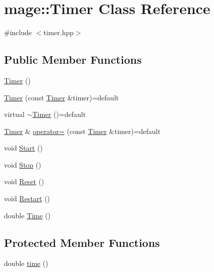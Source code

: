 \hypertarget{classmage_1_1_timer}{}\section{mage\+:\+:Timer Class Reference}
\label{classmage_1_1_timer}


{\ttfamily \#include $<$timer.\+hpp$>$}

\subsection*{Public Member Functions}
\begin{DoxyCompactItemize}
\item 
\hyperlink{classmage_1_1_timer_a5e1c0a3bb4491b3a43ce05874ad24055}{Timer} ()
\item 
\hyperlink{classmage_1_1_timer_a5a1e05fde40a44cd9434572712142c23}{Timer} (const \hyperlink{classmage_1_1_timer}{Timer} \&timer)=default
\item 
virtual \hyperlink{classmage_1_1_timer_aa301aff0cc5adb2e0cf128e6ad4c2774}{$\sim$\+Timer} ()=default
\item 
\hyperlink{classmage_1_1_timer}{Timer} \& \hyperlink{classmage_1_1_timer_ae83df63d5ff9eec370eddf208ac2077e}{operator=} (const \hyperlink{classmage_1_1_timer}{Timer} \&timer)=default
\item 
void \hyperlink{classmage_1_1_timer_a5855c9df8ad1a2b6774942e566833647}{Start} ()
\item 
void \hyperlink{classmage_1_1_timer_abf234f1e2ee9e760f316bd49500d5a3a}{Stop} ()
\item 
void \hyperlink{classmage_1_1_timer_a0675ff7bc0a8e7343b5a35f865cc9c1a}{Reset} ()
\item 
void \hyperlink{classmage_1_1_timer_a4e1ba19d02c290a18981db1766f006c3}{Restart} ()
\item 
double \hyperlink{classmage_1_1_timer_a5e4655ac296cc8971b54e5a76082f00f}{Time} ()
\end{DoxyCompactItemize}
\subsection*{Protected Member Functions}
\begin{DoxyCompactItemize}
\item 
double \hyperlink{classmage_1_1_timer_a782882e9dbe9a2843b5203ba13309b23}{time} ()
\end{DoxyCompactItemize}
